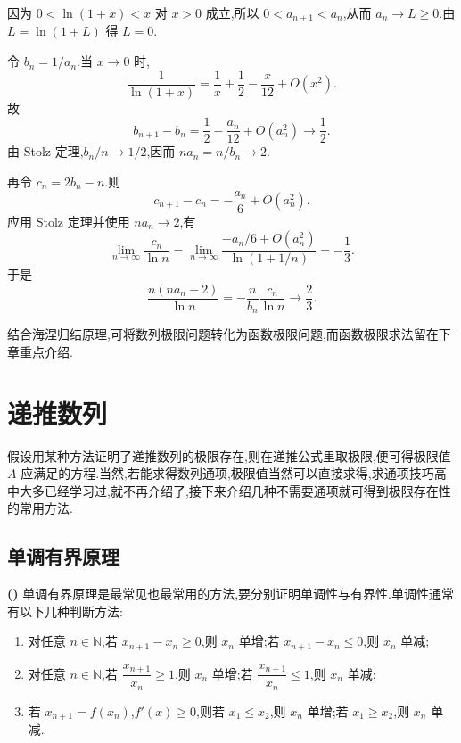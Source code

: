 \begin{solution}
  因为 $0<\ln(1+x)<x$ 对 $x>0$ 成立,所以
  $0<a_{n+1}<a_n$,从而 $a_n\to L\geq0$.由 $L=\ln(1+L)$ 得 $L=0$.

  令 $b_n=1/a_n$.当 $x\to0$ 时,
  \[
    \dfrac{1}{\ln(1+x)}
    =\dfrac{1}{x}+\dfrac{1}{2}-\dfrac{x}{12}+O(x^2).
  \]
  故
  \[
    b_{n+1}-b_n
    =\dfrac{1}{2}-\dfrac{a_n}{12}+O(a_n^2)\longrightarrow\dfrac{1}{2}.
  \]
  由 Stolz 定理,$b_n/n\to1/2$,因而 $na_n=n/b_n\to2$.

  再令 $c_n=2b_n-n$.则
  \[
    c_{n+1}-c_n=-\dfrac{a_n}{6}+O(a_n^2).
  \]
  应用 Stolz 定理并使用 $na_n\to2$,有
  \[
    \lim\limits_{n\to\infty}\dfrac{c_n}{\ln n}
    =\lim\limits_{n\to\infty}
    \dfrac{-a_n/6+O(a_n^2)}{\ln(1+1/n)}
    =-\dfrac{1}{3}.
  \]
  于是
  \[
    \dfrac{n(na_n-2)}{\ln n}
    =-\dfrac{n}{b_n}\dfrac{c_n}{\ln n}
    \longrightarrow\dfrac{2}{3}.
  \]
\end{solution}




结合海涅归结原理,可将数列极限问题转化为函数极限问题,而函数极限求法留在下章重点介绍.


\newpage

\section{递推数列}

假设用某种方法证明了递推数列的极限存在,则在递推公式里取极限,便可得极限值 $A$ 应满足的方程.当然,若能求得数列通项,极限值当然可以直接求得,求通项技巧高中大多已经学习过,就不再介绍了,接下来介绍几种不需要通项就可得到极限存在性的常用方法.



\subsection{单调有界原理}

\noindent\textbf{(\markstar)} 单调有界原理是最常见也最常用的方法,要分别证明单调性与有界性.单调性通常有以下几种判断方法:

\begin{enumerate}
  \item 对任意 $n\in\mathbb N$,若 $x_{n+1}-x_n\geq0$,则 $x_n$ 单增;若 $x_{n+1}-x_n\leq0$,则 $x_n$ 单减;
  \item 对任意 $n\in\mathbb N$,若 $\dfrac{x_{n+1}}{x_n}\geq1$,则 $x_n$ 单增;若 $\dfrac{x_{n+1}}{x_n}\leq1$,则 $x_n$ 单减;
  \item 若 $x_{n+1}=f(x_n)$,$f'(x)\geq0$,则若 $x_1\leq x_2$,则 $x_n$ 单增;若 $x_1\geq x_2$,则 $x_n$ 单减.
\end{enumerate}

